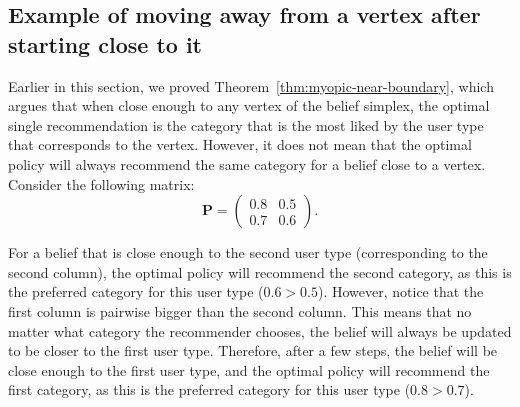 \subsection{Example of moving away from a vertex after starting close to it}

Earlier in this section, we proved Theorem~\ref{thm:myopic-near-boundary}, which argues that when close enough to any vertex of the belief simplex, the optimal single recommendation is the category that is the most liked by the user type that corresponds to the vertex. However, it does not mean that the optimal policy will always recommend the same category for a belief close to a vertex.
Consider the following matrix:
\[
    \bm{P} = \begin{pmatrix}
        0.8 & 0.5 \\
        0.7 & 0.6
    \end{pmatrix}.
\]

For a belief that is close enough to the second user type (corresponding to the second column), the optimal policy will recommend the second category, as this is the preferred category for this user type ($0.6 > 0.5$).
However, notice that the first column is pairwise bigger than the second column.
This means that no matter what category the recommender chooses, the belief will always be updated to be closer to the first user type.
Therefore, after a few steps, the belief will be close enough to the first user type, and the optimal policy will recommend the first category, as this is the preferred category for this user type ($0.8 > 0.7$).
